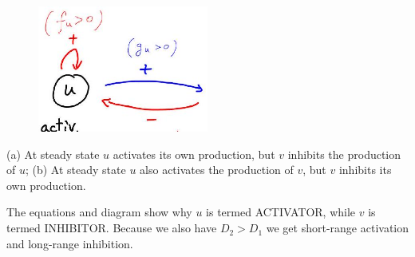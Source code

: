 \begin{enumerate}
\begin{figure}[H]
    \end{figure}
    \begin{figure}[H]
      \centering
      \includegraphics[width=0.5\textwidth]{graphics/2025_10_17_3cf351a4349ae3691080g-12}
    \end{figure}
    (a) At steady state $u$ activates its own production, but $v$ inhibits the
    production of $u$;
    (b) At steady state $u$ also activates the production of $v$, but $v$
    inhibits its own production.

    The equations and diagram show why $u$ is termed ACTIVATOR, while $v$ is
    termed INHIBITOR. Because we also have $D_{2}>D_{1}$ we get short-range
    activation and long-range inhibition.


\end{enumerate}

